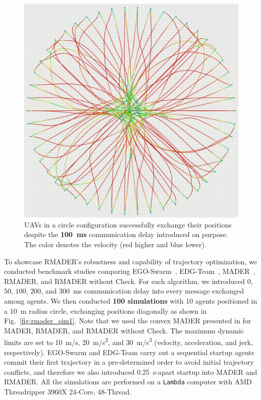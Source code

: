 \begin{figure}[tp]
    \centering
    \includegraphics[width=0.65\columnwidth]{figures/final_50_drone_v2a3j4.png}
    \caption[50 UAVs simulation]{ UAVs in a circle configuration successfully exchange their positions despite the \textbf{\SI{100}{\ms}} communication delay introduced on purpose. The color denotes the velocity (red higher and blue lower).}
\end{figure}


To showcase RMADER's robustness and capability of trajectory optimization, we conducted benchmark studies comparing EGO-Swarm~\cite{zhou2020ego-swarm}, EDG-Team~\cite{Hou2022EnhancedDA}, MADER~\cite{tordesillas2020mader}, RMADER, and RMADER without Check.
For each algorithm, we introduced $0$, $50$, $100$, $200$, and \SI{300}{\ms} communication delay into every message exchanged among agents. 
We then conducted \textbf{100 simulations} with 10 agents positioned in a \SI{10}{\m} radius circle, exchanging positions diagonally as shown in Fig.~\ref{fig:rmader_sim1}.
Note that we used the convex MADER presented in \cite{kondo2022robust} for MADER, RMADER, and RMADER without Check.
The maximum dynamic limits are set to \SI{10}{\m/\s}, \SI{20}{\m/\s^2}, and \SI{30}{\m/\s^3} (velocity, acceleration, and jerk, respectively).
EGO-Swarm and EDG-Team carry out a sequential startup \textemdash agents commit their first trajectory in a pre-determined order to avoid initial trajectory conflicts, and therefore we also introduced \SI{0.25}{\second}-apart startup into MADER and RMADER.
All the simulations are performed on a \texttt{Lambda} computer with AMD Threadripper 3960X 24-Core, 48-Thread. 

